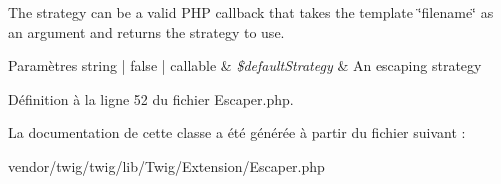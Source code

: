 The strategy can be a valid P\+HP callback that takes the template \char`\"{}filename\char`\"{} as an argument and returns the strategy to use.


\begin{DoxyParams}[1]{Paramètres}
string | false | callable & {\em \$default\+Strategy} & An escaping strategy \\
\hline
\end{DoxyParams}


Définition à la ligne 52 du fichier Escaper.\+php.



La documentation de cette classe a été générée à partir du fichier suivant \+:\begin{DoxyCompactItemize}
\item 
vendor/twig/twig/lib/\+Twig/\+Extension/Escaper.\+php\end{DoxyCompactItemize}
